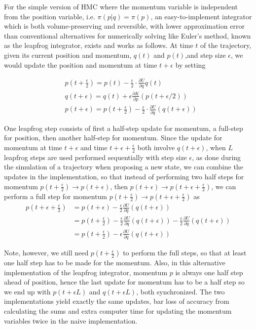\documentclass[]{report}
\begin{document}
For the simple version of HMC where the momentum variable is independent from the position variable, i.e. $\pi(p|q)=\pi(p)$, an easy-to-implement integrator which is both volume-preserving and reversible, with lower approximation error than conventional alternatives for numerically solving like Euler's method, known as the leapfrog integrator, exists and works as follows. At time $t$ of the trajectory, given its current position and momentum, $q(t)$ and $p(t)$,and step size $\epsilon$, we would update the position and momentum at time $t+\epsilon$ by setting 

\begin{align}
    &p(t+\frac{\epsilon}{2}) = p(t) - \frac{\epsilon}{2}\cdot \frac{\partial
    U}{\partial
    q}q(t) \\
    &q(t+\epsilon) = q(t) + \epsilon  \frac{\partial K}{\partial p}(p(t+\epsilon/2))
    \\
    &p(t+\epsilon) = p(t + \frac{\epsilon}{2}) - \frac{\epsilon} {2} \cdot \frac{\partial U}{\partial
    q}(q(t+\epsilon))
\end{align}

One leapfrog step consists of first a half-step update for momentum, a full-step
for position, then another half-step for momentum. Since the update for momentum
at time $t+\epsilon$ and time $t+\epsilon + \frac{\epsilon}{2}$ both involve
$q(t+\epsilon)$, when $L$ leapfrog steps are used performed sequentially with
 step size $\epsilon$, as done during the simulation of a trajectory when proposing a new
 state,  we can combine the updates in the implementation, so that instead of performing two half steps for momentum $p(t+\frac{\epsilon}{2}) \rightarrow p(t+\epsilon)$, then $ p(t+\epsilon) \rightarrow p(t+\epsilon + \frac{\epsilon}{2})$, we can perform a full step for momentum $p(t+\frac{\epsilon}{2}) \rightarrow p(t+ \epsilon + \frac{\epsilon}{2}) $ as 
\begin{align}
p(t+\epsilon + \frac{\epsilon}{2})  
&= p(t+\epsilon) - \frac{\epsilon}{2} \frac{\partial U}{\partial q }(q(t+\epsilon)) \\
&= p(t+\frac{\epsilon}{2}) - \frac{\epsilon}{2} \frac{\partial U}{\partial q }(q(t+\epsilon)) - \frac{\epsilon}{2} \frac{\partial U}{\partial q }(q(t+\epsilon)) \\
&= p(t+\frac{\epsilon}{2}) - \epsilon \frac{\partial U}{\partial q }(q(t+\epsilon))
\end{align}

Note, however, we still need $p(t+\frac{\epsilon}{2})$ to perform the full
steps, so that at least one half step has to be made for the momentum. Also, in
this alternative implementation of the leapfrog integrator, momentum $p$ is
always one half step ahead of position, hence the last update for momentum has
to be a half step so we end up with $p(t+\epsilon L)$ and $q(t+\epsilon L )$,
both synchronized. The two implementations yield exactly the same updates, bar
loss of accuracy from calculating the sums and extra computer time for updating
the momentum variables twice in the naive implementation. 
\end{document}
